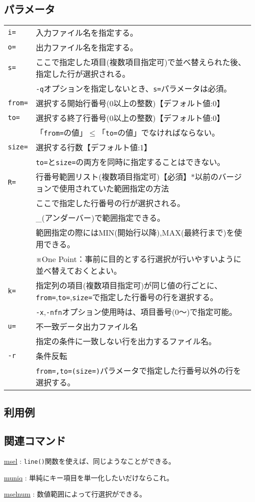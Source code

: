 \subsection*{パラメータ}
\begin{table}[htbp]
{\small
\begin{tabular}{ll}
\verb|i=|    & 入力ファイル名を指定する。\\
\verb|o=|    & 出力ファイル名を指定する。\\
\verb|s=|    & ここで指定した項目(複数項目指定可)で並べ替えられた後、指定した行が選択される。\\
             & \verb|-q|オプションを指定しないとき、\verb|s=|パラメータは必須。\\
\verb|from=| & 選択する開始行番号(0以上の整数)【デフォルト値:0】\\
\verb|to=|   & 選択する終了行番号(0以上の整数)【デフォルト値:0】\\
             & 「\verb|from=|の値」$\le$「\verb|to=|の値」でなければならない。\\
\verb|size=| & 選択する行数【デフォルト値:1】\\
             & \verb|to=|と\verb|size=|の両方を同時に指定することはできない。\\
\verb|R=|    & 行番号範囲リスト(複数項目指定可)【必須】*以前のバージョンで使用されていた範囲指定の方法\\
             & ここで指定した行番号の行が選択される。\\
             & \_(アンダーバー)で範囲指定できる。\\
             & 範囲指定の際にはMIN(開始行以降),MAX(最終行まで)を使用できる。\\
             & ※One Point：事前に目的とする行選択が行いやすいように並べ替えておくとよい。\\
\verb|k=|    & 指定列の項目(複数項目指定可)が同じ値の行ごとに、\verb|from=|,\verb|to=|,\verb|size=|で指定した行番号の行を選択する。\\
             & \verb|-x|,\verb|-nfn|オプション使用時は、項目番号(0〜)で指定可能。\\
\verb|u=|    & 不一致データ出力ファイル名\\
             & 指定の条件に一致しない行を出力するファイル名。\\
\verb|-r|    & 条件反転\\
             & \verb|from=,to=(size=)|パラメータで指定した行番号以外の行を選択する。\\
\end{tabular} 
}
\end{table} 

\subsection*{利用例}


\subsection*{関連コマンド}

\hyperref[sect:msel]{msel} : \verb|line()|関数を使えば、同じようなことができる。

\hyperref[sect:muniq]{muniq} : 単純にキー項目を単一化したいだけならこれ。

\hyperref[sect:mselnum]{mselnum} : 数値範囲によって行選択ができる。

%

